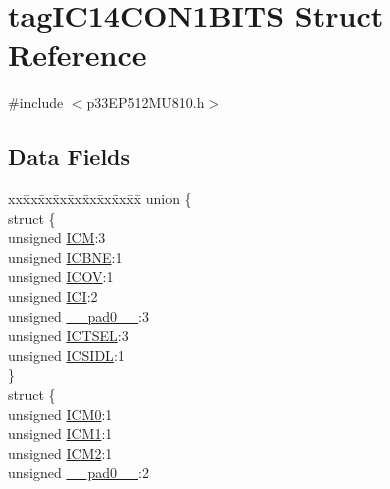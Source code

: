 \hypertarget{structtag_i_c14_c_o_n1_b_i_t_s}{}\section{tag\+I\+C14\+C\+O\+N1\+B\+I\+TS Struct Reference}
\label{structtag_i_c14_c_o_n1_b_i_t_s}


{\ttfamily \#include $<$p33\+E\+P512\+M\+U810.\+h$>$}

\subsection*{Data Fields}
\begin{DoxyCompactItemize}
\item 
\begin{tabbing}
xx\=xx\=xx\=xx\=xx\=xx\=xx\=xx\=xx\=\kill
union \{\\
\>struct \{\\
\>\>unsigned \hyperlink{structtag_i_c14_c_o_n1_b_i_t_s_ad3edde44ecb2d349ffa2decd0a251c20}{ICM}:3\\
\>\>unsigned \hyperlink{structtag_i_c14_c_o_n1_b_i_t_s_a824e7dcca83939e1b049d63ffcee33e9}{ICBNE}:1\\
\>\>unsigned \hyperlink{structtag_i_c14_c_o_n1_b_i_t_s_a49392949376ba0bf58cf8db889e86c94}{ICOV}:1\\
\>\>unsigned \hyperlink{structtag_i_c14_c_o_n1_b_i_t_s_a72486dcb868aad2d5c978494691356cc}{ICI}:2\\
\>\>unsigned \hyperlink{structtag_i_c14_c_o_n1_b_i_t_s_adf71f3d8410c1f1dbbc96680a92c49af}{\_\_pad0\_\_}:3\\
\>\>unsigned \hyperlink{structtag_i_c14_c_o_n1_b_i_t_s_a7a9dd41b5f93eb620df7fa336e452677}{ICTSEL}:3\\
\>\>unsigned \hyperlink{structtag_i_c14_c_o_n1_b_i_t_s_af441b36127c0bb7a35162dfc9a64103c}{ICSIDL}:1\\
\>\} \\
\>struct \{\\
\>\>unsigned \hyperlink{structtag_i_c14_c_o_n1_b_i_t_s_a649b1dd9bca75e558f37a9f52a829bd4}{ICM0}:1\\
\>\>unsigned \hyperlink{structtag_i_c14_c_o_n1_b_i_t_s_af3fe77ef9f8ca41ff11519f445e7bc77}{ICM1}:1\\
\>\>unsigned \hyperlink{structtag_i_c14_c_o_n1_b_i_t_s_a3c62c9cbbc3a406402126c932b709db8}{ICM2}:1\\
\>\>unsigned \hyperlink{structtag_i_c14_c_o_n1_b_i_t_s_adf71f3d8410c1f1dbbc96680a92c49af}{\_\_pad0\_\_}:2\\

\end{tabbing}
\end{DoxyCompactItemize}

